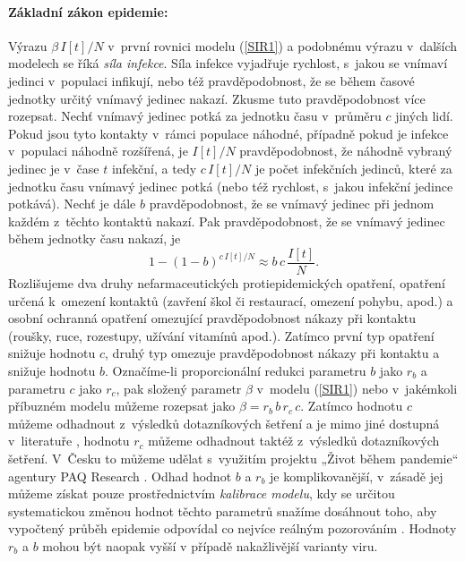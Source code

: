 \paragraph{Základní zákon epidemie:} Výrazu $\beta\,I[t]/N$ v~první rovnici modelu (\ref{SIR1}) a podobnému výrazu v~dalších modelech se říká \emph{síla infekce}. Síla infekce vyjadřuje rychlost, s~jakou se vnímaví jedinci v~populaci infikují, nebo též pravděpodobnost, že se během časové jednotky určitý vnímavý jedinec nakazí. Zkusme tuto pravděpodobnost více rozepsat. Nechť vnímavý jedinec potká za jednotku času v~průměru $c$ jiných lidí. Pokud jsou tyto kontakty v~rámci populace náhodné, případně pokud je infekce v~populaci náhodně rozšířená, je $I[t]/N$ pravděpodobnost, že náhodně vybraný jedinec je v~čase $t$ infekční, a tedy $c\,I[t]/N$ je počet infekčních jedinců, které za jednotku času vnímavý jedinec potká (nebo též rychlost, s~jakou infekční jedince potkává). Nechť je dále $b$ pravděpodobnost, že se vnímavý jedinec při jednom každém z~těchto kontaktů nakazí. Pak pravděpodobnost, že se vnímavý jedinec během jednotky času nakazí, je 
\begin{equation}
1-(1-b)^{c\,I[t]/N} \approx b\, c \, \frac{I[t]}{N}.
\end{equation}
Rozlišujeme dva druhy nefarmaceutických protiepidemických opatření, opatření určená k~omezení kontaktů (zavření škol či restaurací, omezení pohybu, apod.) a osobní ochranná opatření omezující pravděpodobnost nákazy při kontaktu (roušky, ruce, rozestupy, užívání vitamínů apod.). Zatímco první typ opatření snižuje hodnotu $c$, druhý typ omezuje pravděpodobnost nákazy při kontaktu a snižuje hodnotu $b$. Označíme-li proporcionální redukci parametru $b$ jako $r_b$ a parametru $c$ jako $r_c$, pak složený parametr $\beta$ v~modelu (\ref{SIR1}) nebo v~jakémkoli příbuzném modelu můžeme rozepsat jako $\beta = r_b\,b\,r_c\,c$. Zatímco hodnotu $c$ můžeme odhadnout z~výsledků dotazníkových šetření a je mimo jiné dostupná v~literatuře \cite{Prem_etal2017}, hodnotu $r_c$ můžeme odhadnout taktéž z~výsledků dotazníkových šetření. V~Česku to můžeme udělat s~využitím projektu „Život během pandemie“ agentury PAQ Research \cite[\url{www.zivotbehempandemie.cz}]{paqcovid}. Odhad hodnot $b$ a $r_b$ je komplikovanější, v~zásadě jej můžeme získat pouze prostřednictvím \emph{kalibrace modelu}, kdy se určitou systematickou změnou hodnot těchto parametrů snažíme dosáhnout toho, aby vypočtený průběh epidemie odpovídal co nejvíce reálným pozorováním \cite{Yang_etal2014,King_etal2016}. Hodnoty $r_b$ a $b$ mohou být naopak vyšší v případě nakažlivější varianty viru.


